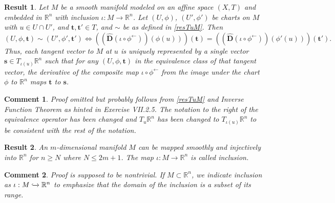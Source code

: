 \documentclass[letterpaper,12pt]{article}
\theoremstyle{plain}
\newtheorem{res}{Result}
\theoremstyle{plain}
\newtheorem*{cmnt*}{Comment}
\theoremstyle{definition}
\begin{document}
\begin{res} \label{resTuM2}Let $M$ be a smooth manifold  modeled on an affine space $(X,T)$ and embedded in $\mathbb{R}^n$ with inclusion $\iota:M\rightarrow \mathbb{R}^n$. Let  $(U,\phi)$, $(U',\phi')$ be charts on $M$ with $u\in U\cap U'$, and $\mathbf{t},\mathbf{t}'\in T$, and $\sim$ be as defined in \autoref{resTuM}. Then
\[ (U,\phi,\mathbf{t}) \sim (U',\phi',\mathbf{t}') \iff \left(\left(\hat{\mathbf{D}}\left(\iota \circ \phi^{\leftarrow}\right)\right)\left(\phi(u)\right)\right)(\mathbf{t}) = \left(\left(\hat{\mathbf{D}}\left(\iota \circ \phi^{\leftarrow}\right)\right)\left(\phi'(u)\right)\right)(\mathbf{t}'). \]
Thus, each tangent vector to $M$ at $u$ is uniquely represented by a single vector  $\mathbf{s}\in T_{\iota(u)}\mathbb{R}^n$ such that for any $(U,\phi,\mathbf{t})$ in the equivalence class of that tangent vector, the derivative of the composite map $\iota \circ \phi^{\leftarrow}$ from the image under the chart $\phi$ to $\mathbb{R}^n$ maps $\mathbf{t}$ to $\mathbf{s}$.
\end{res}

\begin{cmnt*}
Proof omitted but probably follows from \autoref{resTuM} and Inverse Function Theorem as hinted in Exercise VII.2.5. The notation to the right of the equivalence operator has been changed and $T_u\mathbb{R}^n$ has been changed to $T_{\iota(u)}\mathbb{R}^n$ to be consistent with the rest of the notation.
\end{cmnt*}

\begin{res} \label{resEmbed}An $m$-dimensional manifold $M$ can be mapped smoothly and injectively into $\mathbb{R}^n$ for $n\ge N$ where $N\le 2m+1$. The map $\iota:M\rightarrow\mathbb{R}^n$ is called inclusion.
\end{res}

\begin{cmnt*}
Proof is supposed to be nontrivial. If $M\subset \mathbb{R}^n$, we indicate inclusion as $\iota:M\xhookrightarrow{}\mathbb{R}^n$\index{$\xhookrightarrow{}$} to emphasize that the domain of the inclusion is a subset of its range.
\end{cmnt*}
\end{document}
